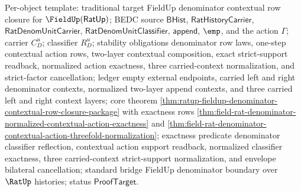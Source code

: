 Per-object template: traditional target FieldUp denominator contextual row
closure for $\FieldUp(\mathsf{RatUp})$; BEDC source $\mathsf{BHist}$,
$\mathsf{RatHistoryCarrier}$, $\mathsf{RatDenomUnitCarrier}$,
$\mathsf{RatDenomUnitClassifier}$, $\mathsf{append}$, $\emp$, and the action
$\Gamma$; carrier $C_D^u$; classifier $R_D^u$; stability obligations
denominator row laws, one-step contextual action rows, two-layer contextual
composition, exact strict-support readback, normalized action exactness, three
carried-context normalization, and strict-factor cancellation; ledger empty
external endpoints, carried left and right denominator contexts, normalized
two-layer append contexts, and three carried left and right context layers; core
theorem \autoref{thm:ratup-fieldup-denominator-contextual-row-closure-package}
with exactness rows
\autoref{thm:field-rat-denominator-normalized-contextual-action-exactness} and
\autoref{thm:field-rat-denominator-contextual-action-threefold-normalization};
exactness predicate denominator classifier reflection, contextual action
support readback, normalized classifier exactness, three carried-context
strict-support normalization, and envelope bilateral cancellation; standard
bridge FieldUp denominator boundary over $\RatUp$ histories; status
$\mathsf{ProofTarget}$.



